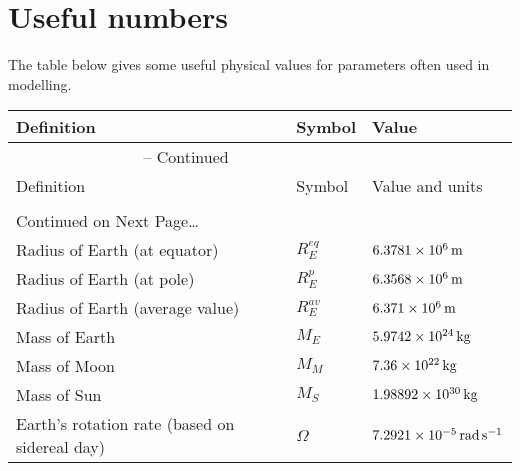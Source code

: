 \chapter{Useful numbers}

The table below gives some useful physical values for parameters often used in modelling.

\begin{center}
\begin{longtable}{lll}
\hline\hline
Definition & Symbol & Value\\
\hline
\endfirsthead
%
\multicolumn{2}{c}{{\tablename} -- Continued} \\[0.5ex]
\hline\hline
Definition & Symbol & Value and units\\
\hline
\endhead
  \\[0.5ex]
  \multicolumn{2}{l}{{Continued on Next Page\ldots}} \\
\endfoot
  \hline
\endlastfoot
%
Radius of Earth (at equator)                    &  $R_E^{eq}$   &  $\m[6.3781\times 10^6]$\\
Radius of Earth (at pole)                       &  $R_E^{p}$    &  $\m[6.3568\times 10^6]$\\
Radius of Earth (average value)                 &  $R_E^{av}$   &  $\m[6.371\times 10^6]$\\
Mass of Earth                                   &  $M_E$        &  $\kg[5.9742\times 10^{24}]$\\
Mass of Moon                                    &  $M_M$        &  $\kg[7.36\times 10^{22}]$\\
Mass of Sun                                     &  $M_S$        &  $\kg[1.98892\times 10^{30}]$\\
Earth's rotation rate (based on sidereal day)   &  $\Omega$     &  $\rads[7.2921\times 10^{-5}]$\\
\end{longtable}
\end{center}
